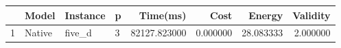 \begin{tabular}{llllrrrr}
\toprule
 & Model & Instance & p & Time(ms) & Cost & Energy & Validity \\
\midrule
1 & Native & five_d & 3 & 82127.823000 & 0.000000 & 28.083333 & 2.000000 \\
\bottomrule
\end{tabular}
